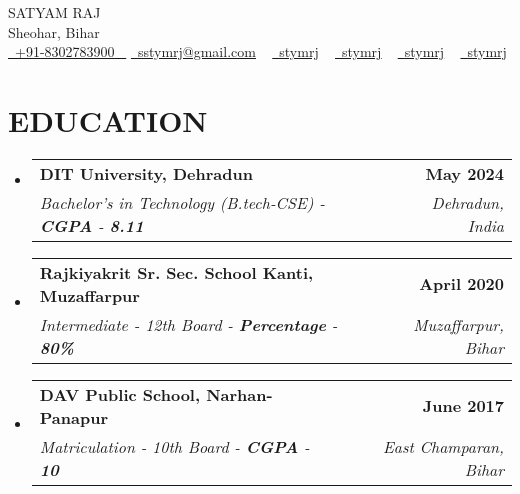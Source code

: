 \documentclass[letterpaper,11pt]{article}
\makeatletter
\newcommand{\resumeSubheading}[4]{
  \vspace{-2pt}\item
    \begin{tabular*}{1.0\textwidth}[t]{l@{\extracolsep{\fill}}r}
      \textbf{\large#1} & \textbf{\small #2} \\
      \textit{\large#3} & \textit{\small #4} \\
     
    \end{tabular*}\vspace{-7pt}
}
\newcommand{\resumeSubHeadingListStart}{\begin{itemize}[leftmargin=0.0in, label={}]}
\newcommand{\resumeSubHeadingListEnd}{\end{itemize}}
\makeatother
\begin{document}




\begin{center}
    {\Huge \scshape SATYAM RAJ} \\ \vspace{1pt}
    Sheohar, Bihar \\ \vspace{1pt}
    \small \href{tel:+xxxxxxxxxxxx}{ \raisebox{-0.1\height}\faPhone\ \underline{+91-8302783900} ~} \href{mailto:sstymrj@gmail.com}{\raisebox{-0.2\height}\faEnvelope\  \underline{sstymrj@gmail.com}} ~
    \href{https://linkedin.com/in/stymrj}{\raisebox{-0.2\height}\faLinkedinSquare\ \underline{stymrj}}  ~
    \href{https://github.com/yourid}{\raisebox{-0.2\height}\faGithub\ \underline{stymrj}} ~
    \href{https://www.hackerrank.com/stymrj}{\raisebox{-0.2\height}\faHackerrank\ \underline{stymrj}} ~
    \href{https://codeforces.com/profile/stymrj}{\raisebox{-0.2\height}\faPoll\ \underline{stymrj}}
    \vspace{-8pt}
\end{center}




\section{EDUCATION}
  \resumeSubHeadingListStart
    \resumeSubheading
      {DIT University, Dehradun}{May 2024}
      {Bachelor's in Technology (B.tech-CSE) - \textbf{CGPA} - \textbf{8.11}}{Dehradun, India}
  \resumeSubHeadingListEnd
 
  \resumeSubHeadingListStart
    \resumeSubheading
      {Rajkiyakrit Sr. Sec. School Kanti, Muzaffarpur }{April 2020}
      {Intermediate - 12th Board  - \textbf{Percentage} - \textbf{80\%}}{Muzaffarpur, Bihar}
  \resumeSubHeadingListEnd


  \resumeSubHeadingListStart
    \resumeSubheading
      {DAV Public School, Narhan-Panapur}{June 2017}
      {Matriculation - 10th Board  - \textbf{CGPA} - \textbf{10}}{East Champaran, Bihar}
  \resumeSubHeadingListEnd


\end{document}
